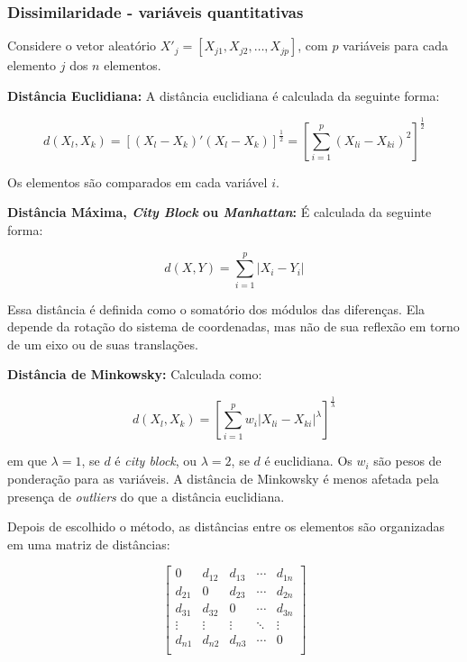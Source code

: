 \documentclass[
]{estat/estat}
\begin{document}
\subsubsection{Dissimilaridade - variáveis
quantitativas}\label{dissimilaridade---variuxe1veis-quantitativas}

Considere o vetor aleatório
\(X'_{j} = [X_{j1}, X_{j2}, \ldots, X_{jp}]\), com \(p\) variáveis para
cada elemento \(j\) dos \(n\) elementos.

\textbf{Distância Euclidiana:} A distância euclidiana é calculada da
seguinte forma:

\[
d(X_{l},X_{k}) = [(X_{l} - X_{k})'(X_{l} - X_{k})]^{\frac{1}{2}} = \left[ \sum_{i=1}^{p}(X_{li}-X_{ki})^2\right]^{\frac{1}{2}}
\]

Os elementos são comparados em cada variável \(i\).

\textbf{Distância Máxima, \emph{City Block} ou \emph{Manhattan}:} É
calculada da seguinte forma:

\[
d(X,Y) = \sum_{i=1}^{p} |X_{i} - Y_{i}|
\]

Essa distância é definida como o somatório dos módulos das diferenças.
Ela depende da rotação do sistema de coordenadas, mas não de sua
reflexão em torno de um eixo ou de suas translações.

\textbf{Distância de Minkowsky:} Calculada como:

\[
d(X_{l}, X_{k}) = \left[ \sum_{i=1}^{p} w_{i} |X_{li} - X_{ki}|^\lambda \right]^{\frac{1}{\lambda}}
\]

em que \(\lambda = 1\), se \(d\) é \emph{city block}, ou
\(\lambda = 2\), se \(d\) é euclidiana. Os \(w_{i}\) são pesos de
ponderação para as variáveis. A distância de Minkowsky é menos afetada
pela presença de \emph{outliers} do que a distância euclidiana.

Depois de escolhido o método, as distâncias entre os elementos são
organizadas em uma matriz de distâncias:

\[
\begin{bmatrix}
        0 & d_{12} & d_{13} & \cdots & d_{1n} \\
        d_{21} & 0 & d_{23} & \cdots & d_{2n} \\
        d_{31} & d_{32} & 0 & \cdots & d_{3n} \\
    \vdots & \vdots & \vdots & \ddots & \vdots \\
        d_{n1} & d_{n2} & d_{n3} & \cdots & 0 \\
\end{bmatrix}
\]
\end{document}

